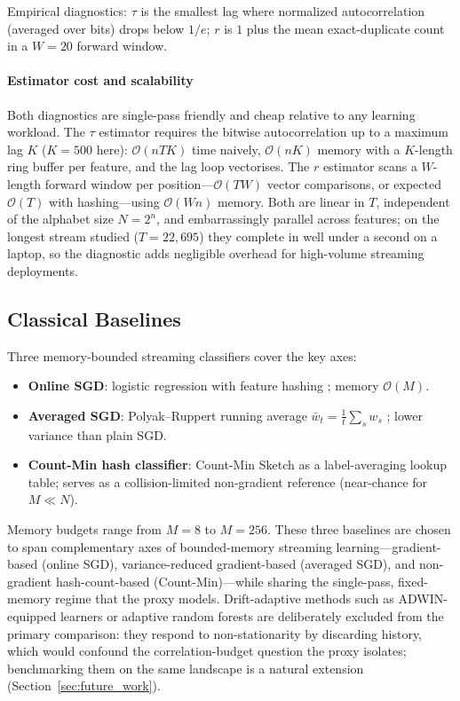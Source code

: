 \documentclass[sensors,article,submit,pdftex,moreauthors]{Definitions/mdpi}
\newcommand{\bigO}{\mathcal{O}}
\begin{document}
Empirical diagnostics: $\tau$ is the smallest lag where normalized autocorrelation (averaged over bits) drops below $1/e$; $r$ is $1$ plus the mean exact-duplicate count in a $W = 20$ forward window.

\paragraph{Estimator cost and scalability} Both diagnostics are single-pass friendly and cheap relative to any learning workload. The $\tau$ estimator requires the bitwise autocorrelation up to a maximum lag $K$ ($K = 500$ here): $\bigO(n T K)$ time naively, $\bigO(n K)$ memory with a $K$-length ring buffer per feature, and the lag loop vectorises. The $r$ estimator scans a $W$-length forward window per position---$\bigO(T W)$ vector comparisons, or expected $\bigO(T)$ with hashing---using $\bigO(W n)$ memory. Both are linear in $T$, independent of the alphabet size $N = 2^n$, and embarrassingly parallel across features; on the longest stream studied ($T = 22{,}695$) they complete in well under a second on a laptop, so the diagnostic adds negligible overhead for high-volume streaming deployments.

\subsection{Classical Baselines}

Three memory-bounded streaming classifiers cover the key axes:
\begin{itemize}
    \item \textbf{Online SGD}: logistic regression with feature hashing \citep{weinberger2009featurehashing, shalev2012online}; memory $\bigO(M)$.
    \item \textbf{Averaged SGD}: Polyak--Ruppert running average $\bar{w}_t = \frac{1}{t}\sum_s w_s$ \citep{polyak1992averaging}; lower variance than plain SGD.
    \item \textbf{Count-Min hash classifier}: Count-Min Sketch \citep{cormode2005improved} as a label-averaging lookup table; serves as a collision-limited non-gradient reference (near-chance for $M \ll N$).
\end{itemize}
Memory budgets range from $M = 8$ to $M = 256$. These three baselines are chosen to span complementary axes of bounded-memory streaming learning---gradient-based (online SGD), variance-reduced gradient-based (averaged SGD), and non-gradient hash-count-based (Count-Min)---while sharing the single-pass, fixed-memory regime that the proxy models. Drift-adaptive methods such as ADWIN-equipped learners or adaptive random forests \citep{bifet2007adwin, gomes2017adaptiverf} are deliberately excluded from the primary comparison: they respond to non-stationarity by discarding history, which would confound the correlation-budget question the proxy isolates; benchmarking them on the same landscape is a natural extension (Section~\ref{sec:future_work}).
\end{document}
